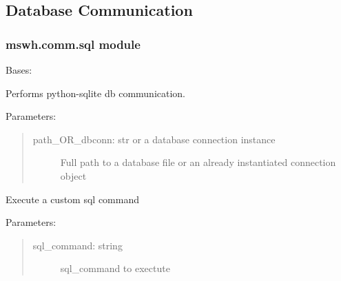 \documentclass[letterpaper,10pt,english,openany]{sphinxmanual}
\begin{document}
\subsection{Database Communication}
\label{\detokenize{source/mswh.comm:database-communication}}\label{\detokenize{source/mswh.comm::doc}}

\subsubsection{mswh.comm.sql module}
\label{\detokenize{source/mswh.comm:module-mswh.comm.sql}}\label{\detokenize{source/mswh.comm:mswh-comm-sql-module}}

\begin{fulllineitems}
\label{\detokenize{source/mswh.comm:mswh.comm.sql.Sql}}
Bases: 

Performs python-sqlite db communication.

Parameters:
\begin{quote}
\begin{description}
\item[{path\_OR\_dbconn: str or a database connection instance}] \leavevmode
Full path to a database file or an already
instantiated connection object

\end{description}
\end{quote}

\begin{fulllineitems}
\label{\detokenize{source/mswh.comm:mswh.comm.sql.Sql.commit}}
Execute a custom sql command

Parameters:
\begin{quote}
\begin{description}
\item[{sql\_command: string}] \leavevmode
sql\_command to exectute

\end{description}
\end{quote}


\end{fulllineitems}
\end{fulllineitems}
\end{document}
